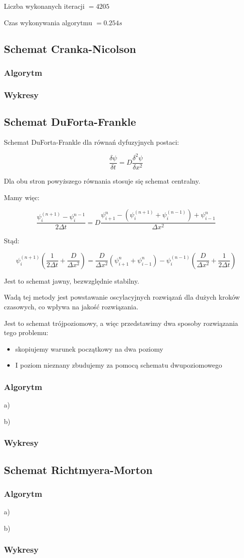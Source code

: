 Liczba wykonanych iteracji $ = 4205 $

Czas wykonywania algorytmu $ = 0.254 s$
\newpage

\newpage
\subsection{Schemat Cranka-Nicolson}
\newpage
\subsubsection{Algorytm}

\newpage
\subsubsection{Wykresy}
\newpage
\subsection{Schemat DuForta-Frankle}
Schemat DuForta-Frankle dla równań dyfuzyjnych postaci:

$$\dfrac{\delta \psi}{\delta t} = D\dfrac{\delta^2 \psi}{\delta x^2}$$

Dla obu stron powyższego równania stosuje się schemat centralny.

Mamy więc:

$$\dfrac{\psi^{(n+1)}_{i}-\psi^{n-1}_{i}}{2\Delta t}=D\dfrac{\psi^{n}_{i+1}- \left( \psi^{(n+1)}_{i} + \psi^{(n-1)}_{i} \right)+\psi^n_{i-1}}{\Delta x^2}$$

Stąd:

$$\psi^{(n+1)}_{i} \left(\dfrac{1}{2 \Delta t} + \dfrac{D}{\Delta x^2}\right)= \dfrac{D}{\Delta x^2} \left( \psi^{n}_{i+1} + \psi^{n}_{i-1} \right) - \psi^{(n-1)}_{i} \left( \dfrac{D}{\Delta x^2} + \dfrac{1}{2\Delta t} \right) $$

Jest to schemat jawny, bezwzględnie stabilny. 

Wadą tej metody jest powstawanie oscylacyjnych rozwiązań dla dużych kroków czasowych, co wpływa na jakość rozwiązania.

Jest to schemat trójpoziomowy, a więc przedstawimy dwa sposoby rozwiązania tego problemu:
\begin{itemize}
	\item skopiujemy warunek początkowy na dwa poziomy
	\item I poziom nieznany zbudujemy za pomocą schematu dwupoziomowego
\end{itemize}

\newpage
\subsubsection{Algorytm}
a)

\newpage
b)
%
\newpage
\subsubsection{Wykresy}
\newpage
\subsection{Schemat Richtmyera-Morton}
\newpage
\subsubsection{Algorytm}
a)

\newpage
b)

\newpage
\subsubsection{Wykresy}
\newpage
